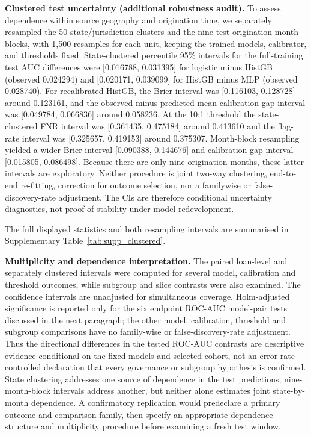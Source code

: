 \documentclass[10pt]{article}
\begin{document}
\noindent\textbf{Clustered test uncertainty (additional robustness audit).} To assess dependence within source geography and origination time, we separately resampled the 50 state/jurisdiction clusters and the nine test-origination-month blocks, with 1,500 resamples for each unit, keeping the trained models, calibrator, and thresholds fixed. State-clustered percentile 95\% intervals for the full-training test AUC differences were [0.016788, 0.031395] for logistic minus HistGB (observed 0.024294) and [0.020171, 0.039099] for HistGB minus MLP (observed 0.028740). For recalibrated HistGB, the Brier interval was [0.116103, 0.128728] around 0.123161, and the observed-minus-predicted mean calibration-gap interval was [0.049784, 0.066836] around 0.058236. At the 10:1 threshold the state-clustered FNR interval was [0.361435, 0.475184] around 0.413610 and the flag-rate interval was [0.325657, 0.419153] around 0.375307. Month-block resampling yielded a wider Brier interval [0.090388, 0.144676] and calibration-gap interval [0.015805, 0.086498]. Because there are only nine origination months, these latter intervals are exploratory. Neither procedure is joint two-way clustering, end-to-end re-fitting, correction for outcome selection, nor a familywise or false-discovery-rate adjustment. The CIs are therefore conditional uncertainty diagnostics, not proof of stability under model redevelopment.

The full displayed statistics and both resampling intervals are summarised in Supplementary Table~\ref{tab:supp_clustered}.

\noindent\textbf{Multiplicity and dependence interpretation.} The paired loan-level and separately clustered intervals were computed for several model, calibration and threshold outcomes, while subgroup and slice contrasts were also examined. The confidence intervals are unadjusted for simultaneous coverage. Holm-adjusted significance is reported only for the six endpoint ROC-AUC model-pair tests discussed in the next paragraph; the other model, calibration, threshold and subgroup comparisons have no family-wise or false-discovery-rate adjustment. Thus the directional differences in the tested ROC-AUC contrasts are descriptive evidence conditional on the fixed models and selected cohort, not an error-rate-controlled declaration that every governance or subgroup hypothesis is confirmed. State clustering addresses one source of dependence in the test predictions; nine-month-block intervals address another, but neither alone estimates joint state-by-month dependence. A confirmatory replication would predeclare a primary outcome and comparison family, then specify an appropriate dependence structure and multiplicity procedure before examining a fresh test window.
\end{document}
